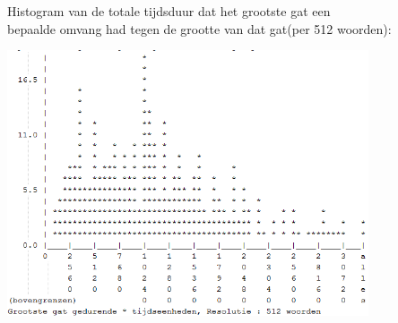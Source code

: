 \documentclass[a4paper]{article}
\begin{document}
			Histogram van de totale tijdsduur dat het grootste gat een\\
			bepaalde omvang had tegen de grootte van dat gat(per 512 woorden):
			\begin{center}
				\includegraphics[width=0.8\textwidth]{ff6.png}
			\end{center}

		\newpage
\end{document}
